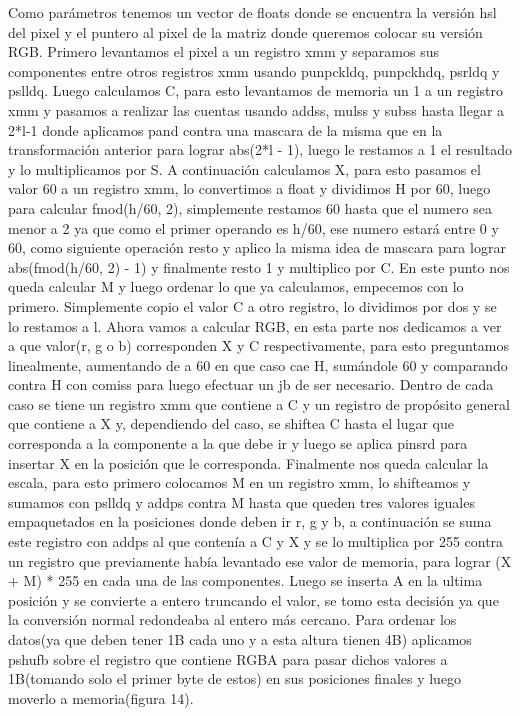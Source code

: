 \documentclass[a4paper]{article}
\begin{document}
Como parámetros tenemos un vector de floats donde se encuentra la versión hsl del pixel y el puntero al pixel de la matriz donde queremos colocar su versión RGB. Primero levantamos el pixel a un registro xmm y separamos sus componentes entre otros registros xmm usando punpckldq, punpckhdq, psrldq y pslldq.
\newline
Luego calculamos C, para esto levantamos de memoria un 1 a un registro xmm y pasamos a realizar las cuentas usando addss, mulss y subss hasta llegar a 2*l-1 donde aplicamos pand contra una mascara de la misma que en la transformación anterior para lograr abs(2*l - 1), luego le restamos a 1 el resultado y lo multiplicamos por S.
\newline
A continuación calculamos X, para esto pasamos el valor 60 a un registro xmm, lo convertimos a float y dividimos H por 60, luego para calcular fmod(h/60, 2), simplemente restamos 60 hasta que el numero sea menor a 2 ya que como el primer operando es h/60, ese numero estará entre 0 y 60, como siguiente operación resto y aplico la misma idea de mascara para lograr abs(fmod(h/60, 2) - 1) y finalmente resto 1 y multiplico por C.
\newline
En este punto nos queda calcular M y luego ordenar lo que ya calculamos, empecemos con lo primero. Simplemente copio el valor C a otro registro, lo dividimos por dos y se lo restamos a l.
\newline
Ahora vamos a calcular RGB, en esta parte nos dedicamos a ver a que valor(r, g o b) corresponden X y C respectivamente, para esto preguntamos linealmente, aumentando de a 60 en que caso cae H, sumándole 60 y comparando contra H con comiss para luego efectuar un jb de ser necesario. Dentro de cada caso se tiene un registro xmm que contiene a C y un registro de propósito general que contiene a X y, dependiendo del caso, se shiftea C hasta el lugar que corresponda a la componente a la que debe ir y luego se aplica pinsrd para insertar X en la posición que le corresponda.
\newline
Finalmente nos queda calcular la escala, para esto primero colocamos M en un registro xmm, lo shifteamos y sumamos con pslldq y addps contra M hasta que queden tres valores iguales empaquetados en la posiciones donde deben ir r, g y b, a continuación se suma este registro con addps al que contenía a C y X y se lo multiplica por 255 contra un registro que previamente había levantado ese valor de memoria, para lograr (X + M) * 255 en cada una de las componentes. Luego se inserta A en la ultima posición y se convierte a entero truncando el valor, se tomo esta decisión ya que la conversión normal redondeaba al entero más cercano.
\newline
Para ordenar los datos(ya que deben tener 1B cada uno y a esta altura tienen 4B) aplicamos pshufb sobre el registro que contiene RGBA para pasar dichos valores a 1B(tomando solo el primer byte de estos) en sus posiciones finales y luego moverlo a memoria(figura 14).
\end{document}
